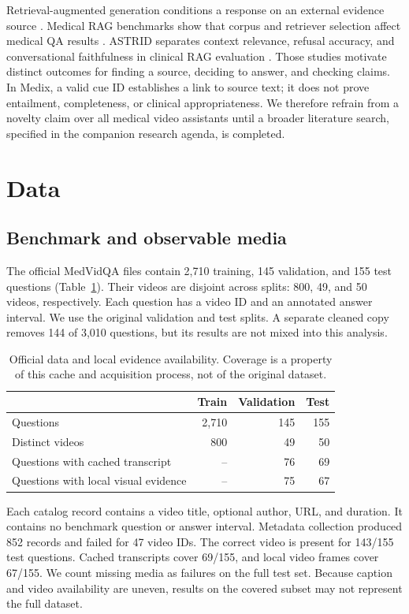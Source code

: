 \documentclass[sigconf,authorversion,nonacm]{acmart}
\begin{document}
Retrieval-augmented generation conditions a response on an external evidence source \cite{lewis2020rag}. Medical RAG benchmarks show that corpus and retriever selection affect medical QA results \cite{xiong2024medrag}. ASTRID separates context relevance, refusal accuracy, and conversational faithfulness in clinical RAG evaluation \cite{he2025astrid}. Those studies motivate distinct outcomes for finding a source, deciding to answer, and checking claims. In Medix, a valid cue ID establishes a link to source text; it does not prove entailment, completeness, or clinical appropriateness. We therefore refrain from a novelty claim over all medical video assistants until a broader literature search, specified in the companion research agenda, is completed.

\section{Data}
\subsection{Benchmark and observable media}
The official MedVidQA files contain 2,710 training, 145 validation, and 155 test questions (Table~\ref{tab:data}). Their videos are disjoint across splits: 800, 49, and 50 videos, respectively. Each question has a video ID and an annotated answer interval. We use the original validation and test splits. A separate cleaned copy removes 144 of 3,010 questions, but its results are not mixed into this analysis.

\begin{table}[t]
\caption{Official data and local evidence availability. Coverage is a property of this cache and acquisition process, not of the original dataset.}
\label{tab:data}
\centering
\begin{tabular}{lrrr}
\toprule
 & Train & Validation & Test \\
\midrule
Questions & 2,710 & 145 & 155 \\
Distinct videos & 800 & 49 & 50 \\
Questions with cached transcript & -- & 76 & 69 \\
Questions with local visual evidence & -- & 75 & 67 \\
\bottomrule
\end{tabular}
\end{table}

Each catalog record contains a video title, optional author, URL, and duration. It contains no benchmark question or answer interval. Metadata collection produced 852 records and failed for 47 video IDs. The correct video is present for 143/155 test questions. Cached transcripts cover 69/155, and local video frames cover 67/155. We count missing media as failures on the full test set. Because caption and video availability are uneven, results on the covered subset may not represent the full dataset.
\end{document}
